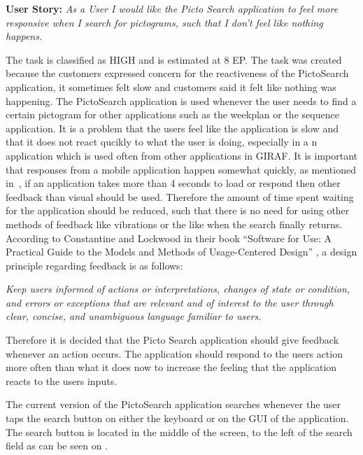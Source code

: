 \textbf{User Story:} \textit{As a User I would like the Picto Search application to feel more responsive when I search for pictograms, such that I don't feel like nothing happens.} \newline

The task is classified as HIGH and is estimated at 8 EP.
The task was created because the customers expressed concern for the reactiveness of the PictoSearch application, it sometimes felt slow and customers said it felt like nothing was happening.
The PictoSearch application is used whenever the user needs to find a certain pictogram for other applications such as the weekplan or the sequence application.
It is a problem that the users feel like the application is slow and that it does not react qucikly to what the user is doing, especially in a n application which is used often from other applications in GIRAF.
It is important that responses from a mobile application happen somewhat quickly, as mentioned in~\cite{Roto:2005:NNF:1062745.1062747}, if an application takes more than 4 seconds to load or respond then other feedback than visual should be used.
Therefore the amount of time spent waiting for the application should be reduced, such that there is no need for using other methods of feedback like vibrations or the like when the search finally returns.
According to Constantine and Lockwood in their book ``Software for Use: A Practical Guide to the Models and Methods of Usage-Centered Design'' \cite{DESIGNBOOK}, a design principle regarding feedback is as follows:

\begin{displayquote}
\textit{Keep users informed of actions or interpretations, changes of state or condition, and errors or exceptions that are relevant and of interest to the user through clear, concise, and unambiguous language familiar to users\cite[p.~57]{DESIGNBOOK}.}
\end{displayquote}

Therefore it is decided that the Picto Search application should give feedback whenever an action occurs.
The application should respond to the users action more often than what it does now to increase the feeling that the application reacts to the users inputs.

The current version of the PictoSearch application searches whenever the user taps the search button on either the keyboard or on the GUI of the application.
The search button is located in the middle of the screen, to the left of the search field as can be seen on .

